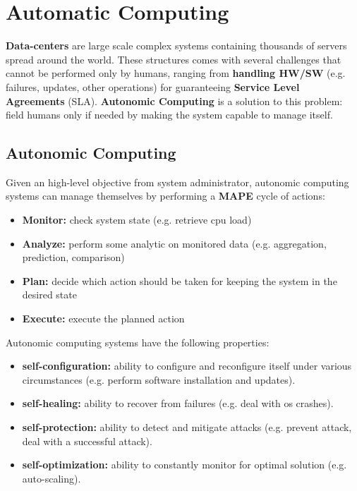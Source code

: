 \documentclass{article}
\begin{document}
\section{Automatic Computing}
\textbf{Data-centers} are large scale complex systems containing thousands of servers spread around the world. These structures comes with several challenges that cannot be performed only by humans, ranging from \textbf{handling HW/SW} (e.g. failures, updates, other operations) for guaranteeing \textbf{Service Level Agreements} (SLA). \textbf{Autonomic Computing} is a solution to this problem: field humans only if needed by making the system capable to manage itself.

\subsection{Autonomic Computing}
Given an high-level objective from system administrator, autonomic computing systems can manage themselves by performing a \textbf{MAPE} cycle of actions:
\begin{itemize}
    \item \textbf{Monitor:} check system state (e.g. retrieve cpu load)
    \item \textbf{Analyze:} perform some analytic on monitored data (e.g. aggregation, prediction, comparison) 
    \item \textbf{Plan:} decide which action should be taken for keeping the system in the desired state
    \item \textbf{Execute:} execute the planned action
\end{itemize}
Autonomic computing systems have the following properties:
\begin{itemize}
    \item \textbf{self-configuration:} ability to configure and reconfigure itself under various circumstances (e.g. perform software installation and updates).
    \item \textbf{self-healing:} ability to recover from failures (e.g. deal with os crashes).
    \item \textbf{self-protection:} ability to detect and mitigate attacks (e.g. prevent attack, deal with a successful attack).
    \item \textbf{self-optimization:} ability to constantly monitor for optimal solution (e.g. auto-scaling).
\end{itemize}
\end{document}
